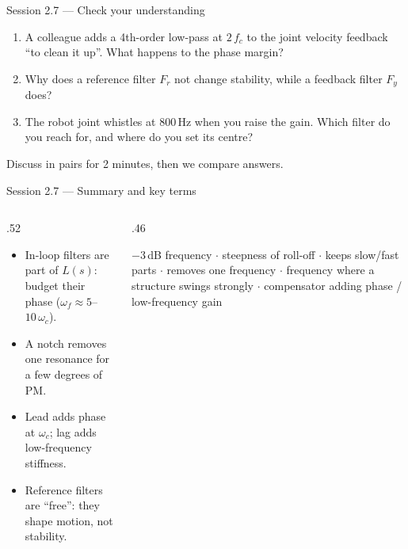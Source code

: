 \documentclass[aspectratio=169,10pt]{beamer}
\begin{document}
\begin{frame}{Session 2.7 --- Check your understanding}
\begin{keybox}
\begin{enumerate}\setlength\itemsep{2mm}
\item A colleague adds a 4th-order low-pass at $2\,f_c$ to the joint velocity feedback ``to clean it up''. What happens to the phase margin?
\item Why does a reference filter $F_r$ not change stability, while a feedback filter $F_y$ does?
\item The robot joint whistles at 800\,Hz when you raise the gain. Which filter do you reach for, and where do you set its centre?
\end{enumerate}
\end{keybox}
\vspace{2mm}
{\small\color{mkGray}Discuss in pairs for 2 minutes, then we compare answers.}
\end{frame}

\begin{frame}{Session 2.7 --- Summary and key terms}
\begin{columns}[T]
\begin{column}{.52\textwidth}
\begin{keybox}
\begin{itemize}\setlength\itemsep{.3mm}
\item In-loop filters are part of $L(s)$: budget their phase ($\omega_f\approx5$--$10\,\omega_c$).
\item A notch removes one resonance for a few degrees of PM.
\item Lead adds phase at $\omega_c$; lag adds low-frequency stiffness.
\item Reference filters are ``free'': they shape motion, not stability.
\end{itemize}
\end{keybox}
\end{column}
\begin{column}{.46\textwidth}
\begin{defbox}
\small
{} $-3$\,dB frequency $\cdot$  steepness of roll-off $\cdot$  keeps slow/fast parts $\cdot$  removes one frequency $\cdot$  frequency where a structure swings strongly $\cdot$  compensator adding phase / low-frequency gain
\end{defbox}
\end{column}
\end{columns}
\end{frame}
\end{document}
